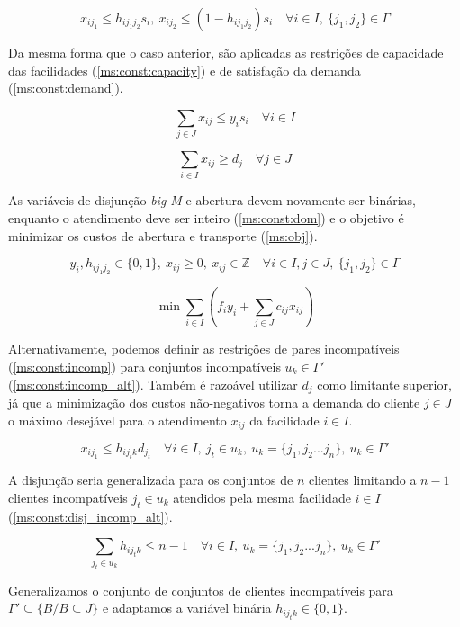 \documentclass[]{article}
\begin{document}
	\begin{equation}
		\label{ms:const:incomp}		
		x_{ij_1} \le h_{ij_1j_2} s_i, 
		\ x_{ij_2} \le (1 - h_{ij_1j_2}) s_i 
		\quad
		\forall i \in I, 
		\ \{ j_1, j_2 \} \in \Gamma  
	\end{equation}
	
	Da mesma forma que o caso anterior, são aplicadas as restrições de capacidade das facilidades (\ref{ms:const:capacity}) e de satisfação da demanda (\ref{ms:const:demand}).
	
	\begin{equation}
		\label{ms:const:capacity}		
		\sum_{j \in J} x_{ij} \le y_i s_i 
		\quad
		\forall i \in I
	\end{equation}	
	
	\begin{equation}
		\label{ms:const:demand}		
		\sum_{i \in I} x_{ij} \ge d_j 
		\quad
		\forall j \in J
	\end{equation}
	
	As variáveis de disjunção \textit{big M} e abertura devem novamente ser binárias, enquanto o atendimento deve ser inteiro (\ref{ms:const:dom}) 
	e o objetivo é minimizar os custos de abertura e transporte (\ref{ms:obj}).
	
	\begin{equation}
		\label{ms:const:dom}		
		y_i, h_{ij_1j_2} \in \{0, 1\}, 
		\ x_{ij} \ge 0, 
		\ x_{ij} \in \mathbb{Z}
		\quad
		\forall i \in I, j \in J, 		
		\ \{ j_1, j_2 \} \in \Gamma
	\end{equation}	
	
	\begin{equation}
		\label{ms:obj}		
		\min \sum_{i \in I} 
		(
		f_i y_i + \sum_{j \in J} c_{ij} x_{ij}
		)
	\end{equation}

	Alternativamente, podemos definir as restrições de pares incompatíveis (\ref{ms:const:incomp}) para conjuntos incompatíveis $u_k \in \Gamma'$ (\ref{ms:const:incomp_alt}). 
	Também é razoável utilizar $d_j$ como limitante superior, 
	já que a minimização dos custos não-negativos torna a demanda do cliente $j \in J$ o máximo desejável para o atendimento $x_{ij}$ da facilidade $i \in I$.   
	
	\begin{equation}
		\label{ms:const:incomp_alt}		
		x_{ij_1} \le h_{ij_tk} d_{j_t} 
		\quad
		\forall i \in I, 
		\ j_t \in u_k,
		\ u_k = \{ j_1, j_2 ... j_n \},
		\ u_k \in \Gamma'  
	\end{equation}
	
	A disjunção seria generalizada para os conjuntos de $n$ clientes limitando a $n-1$ clientes incompatíveis $j_t \in u_k$ atendidos pela mesma facilidade $i \in I$ (\ref{ms:const:disj_incomp_alt}). 
	
	\begin{equation}
		\label{ms:const:disj_incomp_alt}
		\sum_{j_t \in u_k} h_{ij_tk} \le n - 1 
		\quad
		\forall i \in I, 
		\ u_k = \{ j_1, j_2 ... j_n \},
		\ u_k \in \Gamma'  
	\end{equation}

	Generalizamos o conjunto de conjuntos de clientes incompatíveis para $\Gamma' \subseteq \{ B / B \subseteq J \}$ e adaptamos a variável binária $h_{ij_tk} \in \{0,1\}$. 
	 
\end{document}
